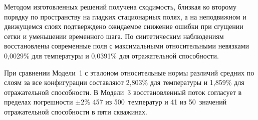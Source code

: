 Методом изготовленных решений получена сходимость, близкая ко второму порядку по пространству на гладких стационарных полях, а на неподвижном и движущемся слоях подтверждено ожидаемое снижение ошибки при сгущении сетки и уменьшении временного шага. По синтетическим наблюдениям восстановлены современные поля с максимальными относительными невязками 0,0029\% для температуры и 0,0391\% для отражательной способности.

При сравнении Модели~1 с эталоном относительные нормы различий средних по слоям за все конфигурации составляют 2,803\% для температуры и 1,859\% для отражательной способности. В Модели~3 восстановленный поток согласует в пределах погрешности $\pm2\%$ 457 из 500~температур и 41 из 50~значений отражательной способности в пяти скважинах.
